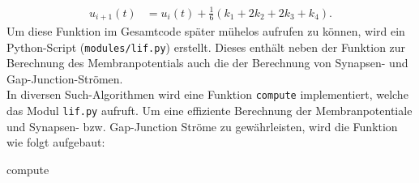 	\begin{align}
		\label{eq:runkgekutta_erg}
		u_{i+1}(t) &= u_i(t) + \tfrac{1}{6} (k_1 + 2 k_2 + 2 k_3 + k_4).
	\end{align}
	Um diese Funktion im Gesamtcode später mühelos aufrufen zu können, wird ein Python-Script (\texttt{modules/lif.py}) erstellt. Dieses enthält neben der Funktion zur Berechnung des Membranpotentials auch die der Berechnung von Synapsen- und Gap-Junction-Strömen.\\
	In diversen Such-Algorithmen wird eine Funktion \texttt{compute} implementiert, welche das Modul \texttt{lif.py} aufruft. Um eine effiziente Berechnung der Membranpotentiale und Synapsen- bzw. Gap-Junction Ströme zu gewährleisten, wird die Funktion wie folgt aufgebaut:
	\begin{algorithm}
		
		
		\caption{compute}
	\end{algorithm}
